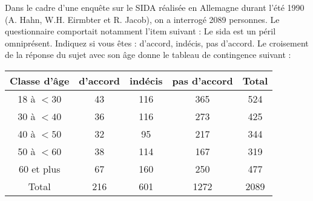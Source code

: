 \auteur{}

Dans le cadre d'une enquête sur le SIDA réalisée en Allemagne durant l'été 1990 (A. Hahn, W.H. Eirmbter et R. Jacob), on a interrogé 2089 personnes. Le questionnaire comportait notamment l'item suivant : Le sida est un péril omniprésent. Indiquez si vous êtes : d'accord, indécis, pas d'accord. Le croisement de la réponse du sujet avec son âge donne le tableau de contingence suivant :

\begin{center}
	\begin{tabular}{|c|c|c|c|c|}
	\hline Classe d'âge & d'accord & indécis & pas d'accord & Total \\
	\hline 18 à $<30$ & 43 & 116 & 365 & 524 \\
	30 à $<40$ & 36 & 116 & 273 & 425 \\
	40 à $<50$ & 32 & 95 & 217 & 344 \\
	50 à $<60$ & 38 & 114 & 167 & 319 \\
	60 et plus & 67 & 160 & 250 & 477 \\
	\hline Total & 216 & 601 & 1272 & 2089 \\
	\hline
\end{tabular}
\end{center}

